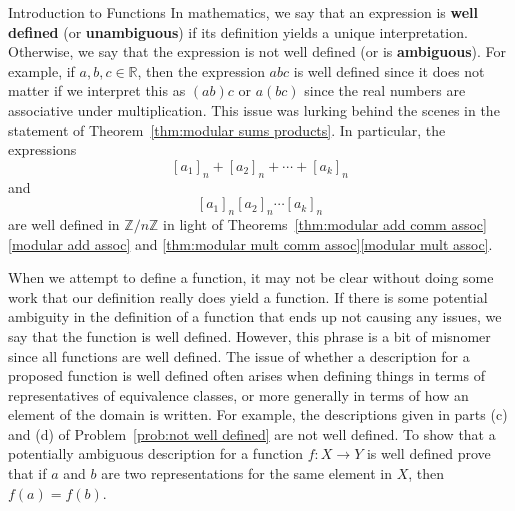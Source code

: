 \begin{section}{Introduction to Functions}
In mathematics, we say that an expression is \textbf{well defined} (or \textbf{unambiguous}) if its definition yields a unique interpretation.  Otherwise, we say that the expression is not well defined (or is \textbf{ambiguous}).  For example, if $a,b,c\in\mathbb{R}$, then the expression $abc$ is well defined since it does not matter if we interpret this as $(ab)c$ or $a(bc)$ since the real numbers are associative under multiplication.  This issue was lurking behind the scenes in the statement of Theorem~\ref{thm:modular sums products}.  In particular, the expressions
\[
[a_1]_n+[a_2]_n+\cdots+ [a_k]_n
\]
and
\[
[a_1]_n [a_2]_n \cdots  [a_k]_n
\]
are well defined in $\mathbb{Z}/n\mathbb{Z}$ in light of Theorems~\ref{thm:modular add comm assoc}\ref{modular add assoc} and \ref{thm:modular mult comm assoc}\ref{modular mult assoc}.

When we attempt to define a function, it may not be clear without doing some work that our definition really does yield a function. If there is some potential ambiguity in the definition of a function that ends up not causing any issues, we say that the function is well defined. However, this phrase is a bit of misnomer since all functions are well defined. The issue of whether a description for a proposed function is well defined often arises when defining things in terms of representatives of equivalence classes, or more generally in terms of how an element of the domain is written.  For example, the descriptions given in parts (c) and (d) of Problem~\ref{prob:not well defined} are not well defined.  To show that a potentially ambiguous description for a function $f:X\to Y$ is well defined prove that if $a$ and $b$ are two representations for the same element in $X$, then $f(a)=f(b)$.


\end{section}
